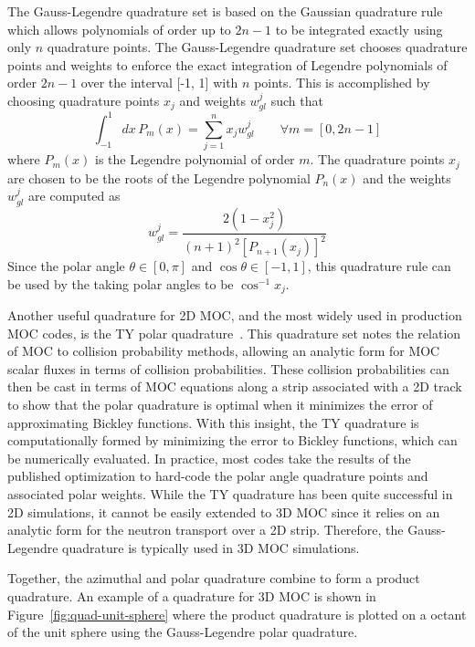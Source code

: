 The Gauss-Legendre quadrature set is based on the Gaussian quadrature rule which allows polynomials of order up to $2n-1$ to be integrated exactly using only $n$ quadrature points. The Gauss-Legendre quadrature set chooses quadrature points and weights to enforce the exact integration of Legendre polynomials of order $2n-1$ over the interval [-1, 1] with $n$ points. This is accomplished by choosing quadrature points $x_j$ and weights $w_{\textit{gl}}^j$ such that
\begin{equation}
\int_{-1}^{1} dx \, P_m(x) = \sum_{j=1}^n x_j w_{\textit{gl}}^j \qquad \forall m = [0, 2n-1]
\end{equation}
where $P_m(x)$ is the Legendre polynomial of order $m$. The quadrature points $x_j$ are chosen to be the roots of the Legendre polynomial $P_n(x)$ and the weights $w_{\textit{gl}}^j$ are computed as
\begin{equation}
w_{\textit{gl}}^j = \frac{2(1-x_j^2)}{(n+1)^2\left[P_{n+1}(x_j)\right]^2}
\end{equation}
Since the polar angle $\theta \in [0, \pi]$ and $\cos{\theta} \in [-1, 1]$, this quadrature rule can be used by the taking polar angles to be $\cos^{-1} x_j$.  

Another useful quadrature for 2D \ac{MOC}, and the most widely used in production \ac{MOC} codes, is the TY polar quadrature~\cite{ty-quadrature}. This quadrature set notes the relation of \ac{MOC} to collision probability methods, allowing an analytic form for \ac{MOC} scalar fluxes in terms of collision probabilities. These collision probabilities can then be cast in terms of \ac{MOC} equations along a strip associated with a 2D track to show that the polar quadrature is optimal when it minimizes the error of approximating Bickley functions. With this insight, the TY quadrature is computationally formed by minimizing the error to Bickley functions, which can be numerically evaluated. In practice, most codes take the results of the published optimization to hard-code the polar angle quadrature points and associated polar weights. While the TY quadrature has been quite successful in 2D simulations, it cannot be easily extended to 3D \ac{MOC} since it relies on an analytic form for the neutron transport over a 2D strip. Therefore, the Gauss-Legendre quadrature is typically used in 3D \ac{MOC} simulations. 

Together, the azimuthal and polar quadrature combine to form a product quadrature. An example of a quadrature for 3D MOC is shown in Figure~\ref{fig:quad-unit-sphere} where the product quadrature is plotted on a octant of the unit sphere using the Gauss-Legendre polar quadrature.

